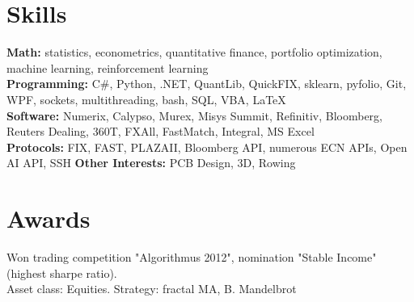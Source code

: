 \documentclass[letterpaper,hidelinks]{article}
\newcommand{\resumeSubHeadingListStart}{\begin{itemize}[leftmargin=0.1in, label={}]}
\newcommand{\resumeSubHeadingListEnd}{\end{itemize}}
\begin{document}
\section{Skills}
\resumeSubHeadingListStart
\small{\item{
              \textbf{{Math:}}{ statistics, econometrics, quantitative finance, portfolio optimization, machine learning, reinforcement learning\\} %
              \textbf{{Programming:}}{ C\#, Python, .NET, QuantLib, QuickFIX, sklearn, pyfolio, Git, WPF, sockets, multithreading, bash, SQL, VBA, \LaTeX\\} %
              \textbf{{Software:}}{ Numerix, Calypso, Murex, Misys Summit, Refinitiv, Bloomberg, Reuters Dealing, 360T, FXAll, FastMatch, Integral, MS Excel\\} %
              \textbf{{Protocols:}}{ FIX, FAST, PLAZAII, Bloomberg API, numerous ECN APIs, Open AI API, SSH } %
              \textbf{{Other Interests:}}{ PCB Design, 3D, Rowing} %
        }}

\resumeSubHeadingListEnd
\vspace{-12pt}
\section{Awards}
\begin{description}%
  \item{Won trading competition "Algorithmus 2012", nomination "Stable Income" (highest sharpe ratio). \\Asset class: Equities. Strategy: fractal MA, B. Mandelbrot}  
\vspace{-3pt}
\end{description}
\end{document}
